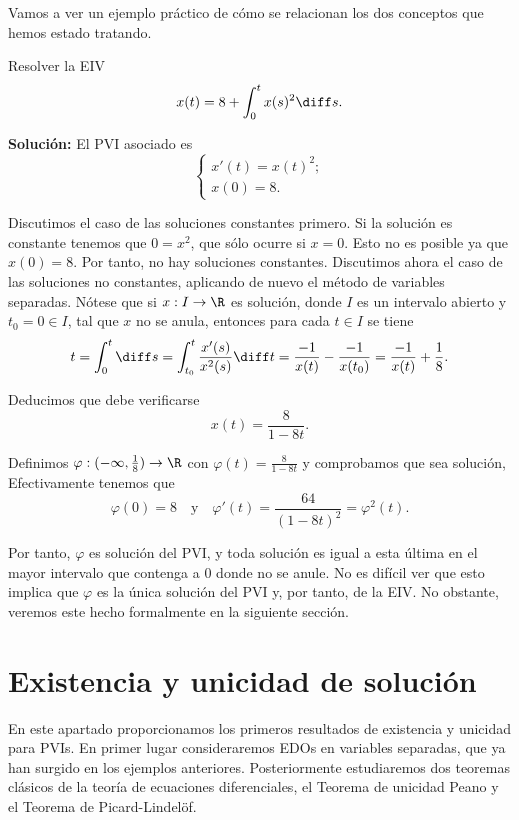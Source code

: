 \documentclass{article}
\begin{document}
Vamos a ver un ejemplo práctico de cómo se relacionan los dos conceptos que hemos estado tratando.

\begin{ex}
  Resolver la EIV
  \[x(t) = 8 + \displaystyle\int_0^t x(s)^2 \diff s. \]
  

  \textbf{Solución:} El PVI asociado es
  \[
    \left\{
      \begin{array}{l}
        x'(t) = x(t)^2; \\
        x(0) = 8.
      \end{array}
    \right.
  \]

  Discutimos el caso de las soluciones constantes primero. Si la solución es constante tenemos que
  $0 = x^2$, que sólo ocurre si $x = 0$.  Esto no es posible ya que $x(0) = 8$. Por tanto, no hay
  soluciones constantes. Discutimos ahora el caso de las soluciones no constantes, aplicando de
  nuevo el método de variables separadas. Nótese que si $x: I \to \R$ es solución, donde $I$ es un
  intervalo abierto y $t_0 = 0 \in I$, tal que $x$ no se anula, entonces para cada $t \in I$ se
  tiene
  \[ t = \int_0^t \diff s = \int_{t_0}^t \frac{x'(s)}{x^2(s)}\diff t = \frac{-1}{x(t)} -
    \frac{-1}{x(t_0)} = \frac{-1}{x(t)} + \frac{1}{8}. \]

  Deducimos que debe verificarse
  \[x(t) = \frac{8}{1 - 8t}.\]
    
  Definimos $\varphi: (-\infty, \frac{1}{8}) \to \R$ con $\varphi(t) = \frac{8}{1-8t}$ y comprobamos
  que sea solución, Efectivamente tenemos que
  \[ \varphi(0) = 8 \quad \text{y} \quad \varphi'(t) = \frac{64}{(1-8t)^2} = \varphi^2(t). \]

  Por tanto, $\varphi$ es solución del PVI, y toda solución es igual a esta última en el mayor
  intervalo que contenga a $0$ donde no se anule. No es difícil ver que esto implica que $\varphi$
  es la única solución del PVI y, por tanto, de la EIV. No obstante, veremos este hecho formalmente
  en la siguiente sección.
\end{ex}

\newpage

\section{Existencia y unicidad de solución} \label{sec:eu}

En este apartado proporcionamos los primeros resultados de existencia y unicidad para PVIs. En
primer lugar consideraremos EDOs en variables separadas, que ya han surgido en los ejemplos
anteriores. Posteriormente estudiaremos dos teoremas clásicos de la teoría de ecuaciones
diferenciales, el Teorema de unicidad Peano y el Teorema de Picard-Lindelöf.
\end{document}
